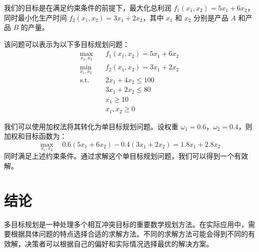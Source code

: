 \documentclass{article}
\begin{document}
我们的目标是在满足约束条件的前提下，最大化总利润 $f_1(x_1, x_2)=5x_1 + 6x_2$，同时最小化生产时间 $f_2(x_1, x_2)=3x_1 + 2x_2$，其中 $x_1$ 和 $x_2$ 分别是产品 $A$ 和产品 $B$ 的产量。

该问题可以表示为以下多目标规划问题：
\begin{align}
\max_{x_1, x_2} \quad & f_1(x_1, x_2)=5x_1 + 6x_2 \\
\min_{x_1, x_2} \quad & f_2(x_1, x_2)=3x_1 + 2x_2 \\
\text{s.t.} \quad & 2x_1 + 4x_2 \leq 100 \\
& 3x_1 + 2x_2 \leq 80 \\
& x_1 \geq 10 \\
& x_1, x_2 \geq 0
\end{align}

我们可以使用加权法将其转化为单目标规划问题。设权重 $\omega_1 = 0.6$，$\omega_2 = 0.4$，则加权和目标函数为：
\[
\max_{x_1, x_2} \quad 0.6(5x_1 + 6x_2)-0.4(3x_1 + 2x_2)=1.8x_1 + 2.8x_2
\]
同时满足上述约束条件。通过求解这个单目标规划问题，我们可以得到一个有效解。

\section{结论}
多目标规划是一种处理多个相互冲突目标的重要数学规划方法。在实际应用中，需要根据具体问题的特点选择合适的求解方法。不同的求解方法可能会得到不同的有效解，决策者可以根据自己的偏好和实际情况选择最优的解决方案。
\end{document}
